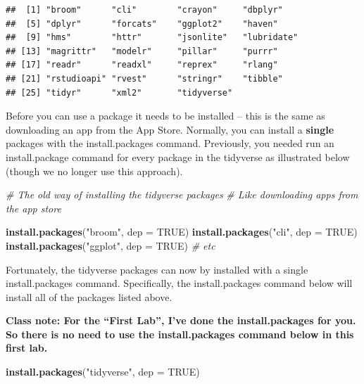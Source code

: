 \documentclass[
]{krantz}
\makeatletter
\newenvironment{Shaded}{\begin{snugshade}}{\end{snugshade}}
\newcommand{\CommentTok}[1]{\textcolor[rgb]{0.37,0.37,0.37}{\textit{#1}}}
\newcommand{\DataTypeTok}[1]{\textcolor[rgb]{0.27,0.27,0.27}{#1}}
\newcommand{\KeywordTok}[1]{\textcolor[rgb]{0.27,0.27,0.27}{\textbf{#1}}}
\newcommand{\NormalTok}[1]{#1}
\newcommand{\OtherTok}[1]{\textcolor[rgb]{0.37,0.37,0.37}{#1}}
\newcommand{\StringTok}[1]{\textcolor[rgb]{0.5,0.5,0.5}{#1}}
\newenvironment{kframe}{%
\medskip{}
\setlength{\fboxsep}{.8em}
 \def\at@end@of@kframe{}%
 \ifinner\ifhmode%
  \def\at@end@of@kframe{\end{minipage}}%
  \begin{minipage}{\columnwidth}%
 \fi\fi%
 \def\FrameCommand##1{\hskip\@totalleftmargin \hskip-\fboxsep
 \colorbox{shadecolor}{##1}\hskip-\fboxsep
     \hskip-\linewidth \hskip-\@totalleftmargin \hskip\columnwidth}%
 \MakeFramed {\advance\hsize-\width
   \@totalleftmargin\z@ \linewidth\hsize
   \@setminipage}}%
 {\par\unskip\endMakeFramed%
 \at@end@of@kframe}
\renewenvironment{Shaded}{\begin{kframe}}{\end{kframe}}
\makeatother
\begin{document}
\begin{verbatim}
##  [1] "broom"      "cli"        "crayon"     "dbplyr"    
##  [5] "dplyr"      "forcats"    "ggplot2"    "haven"     
##  [9] "hms"        "httr"       "jsonlite"   "lubridate" 
## [13] "magrittr"   "modelr"     "pillar"     "purrr"     
## [17] "readr"      "readxl"     "reprex"     "rlang"     
## [21] "rstudioapi" "rvest"      "stringr"    "tibble"    
## [25] "tidyr"      "xml2"       "tidyverse"
\end{verbatim}

Before you can use a package it needs to be installed -- this is the same as downloading an app from the App Store. Normally, you can install a \textbf{single} packages with the install.packages command. Previously, you needed run an install.package command for every package in the tidyverse as illustrated below (though we no longer use this approach).

\begin{Shaded}
\begin{Highlighting}[]
\CommentTok{# The old way of installing the tidyverse packages}
\CommentTok{# Like downloading apps from the app store}

\KeywordTok{install.packages}\NormalTok{(}\StringTok{"broom"}\NormalTok{, }\DataTypeTok{dep =} \OtherTok{TRUE}\NormalTok{)}
\KeywordTok{install.packages}\NormalTok{(}\StringTok{"cli"}\NormalTok{, }\DataTypeTok{dep =} \OtherTok{TRUE}\NormalTok{)}
\KeywordTok{install.packages}\NormalTok{(}\StringTok{"ggplot"}\NormalTok{, }\DataTypeTok{dep =} \OtherTok{TRUE}\NormalTok{)}
\CommentTok{# etc}
\end{Highlighting}
\end{Shaded}

Fortunately, the tidyverse packages can now by installed with a single install.packages command. Specifically, the install.packages command below will install all of the packages listed above.

\textbf{Class note: For the ``First Lab'', I've done the install.packages for you. So there is no need to use the install.packages command below in this first lab.}

\begin{Shaded}
\begin{Highlighting}[]
\KeywordTok{install.packages}\NormalTok{(}\StringTok{"tidyverse"}\NormalTok{, }\DataTypeTok{dep =} \OtherTok{TRUE}\NormalTok{)}
\end{Highlighting}
\end{Shaded}
\end{document}
